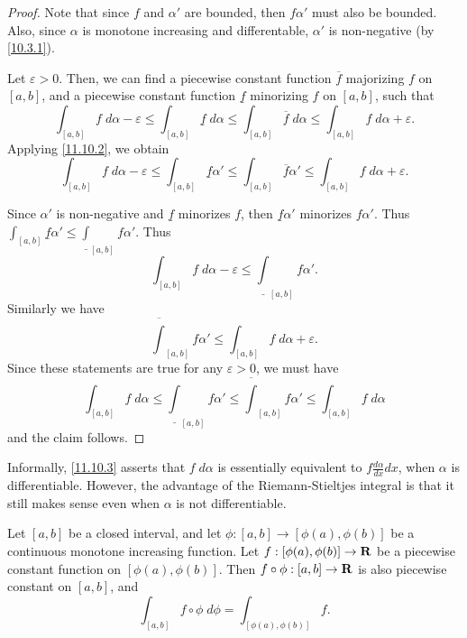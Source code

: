 \begin{proof}
  Note that since \(f\) and \(\alpha'\) are bounded, then \(f \alpha'\) must also be bounded.
  Also, since \(\alpha\) is monotone increasing and differentable, \(\alpha'\) is non-negative (by \cref{10.3.1}).

  Let \(\varepsilon > 0\).
  Then, we can find a piecewise constant function \(\overline{f}\) majorizing \(f\) on \([a, b]\), and a piecewise constant function \(\underline{f}\) minorizing \(f\) on \([a, b]\), such that
  \[
    \int_{[a, b]} f \; d \alpha - \varepsilon \leq \int_{[a, b]} \underline{f} \; d \alpha \leq \int_{[a, b]} \overline{f} \; d \alpha \leq \int_{[a, b]} f \; d \alpha + \varepsilon.
  \]
  Applying \cref{11.10.2}, we obtain
  \[
    \int_{[a, b]} f \; d \alpha - \varepsilon \leq \int_{[a, b]} \underline{f} \alpha' \leq \int_{[a, b]} \overline{f} \alpha' \leq \int_{[a, b]} f \; d \alpha + \varepsilon.
  \]

  Since \(\alpha'\) is non-negative and \(\underline{f}\) minorizes \(f\), then \(\underline{f} \alpha'\) minorizes \(f \alpha'\).
  Thus \(\int_{[a, b]} \underline{f} \alpha' \leq \underline{\int}_{[a, b]} f \alpha'\).
  Thus
  \[
    \int_{[a, b]} f \; d \alpha - \varepsilon \leq \underline{\int}_{[a, b]} f \alpha'.
  \]
  Similarly we have
  \[
    \overline{\int}_{[a, b]} f \alpha' \leq \int_{[a, b]} f \; d \alpha + \varepsilon.
  \]
  Since these statements are true for any \(\varepsilon > 0\), we must have
  \[
    \int_{[a, b]} f \; d \alpha \leq \underline{\int}_{[a, b]} f \alpha' \leq \overline{\int}_{[a, b]} f \alpha' \leq \int_{[a, b]} f \; d \alpha
  \]
  and the claim follows.
\end{proof}

\begin{remark}\label{11.10.4}
  Informally, \cref{11.10.3} asserts that \(f \; d \alpha\) is essentially equivalent to \(f \frac{d \alpha}{dx} dx\), when \(\alpha\) is differentiable.
  However, the advantage of the Riemann-Stieltjes integral is that it still makes sense even when \(\alpha\) is not differentiable.
\end{remark}

\begin{lemma}\label{11.10.5}
  Let \([a, b]\) be a closed interval, and let \(\phi : [a, b] \to [\phi(a), \phi(b)]\) be a continuous monotone increasing function.
  Let \(f : [\phi(a), \phi(b)] \to \mathbf{R}\) be a piecewise constant function on \([\phi(a), \phi(b)]\).
  Then \(f \circ \phi : [a, b] \to \mathbf{R}\) is also piecewise constant on \([a, b]\), and
  \[
    \int_{[a, b]} f \circ \phi \; d \phi = \int_{[\phi(a), \phi(b)]} f.
  \]
\end{lemma}

